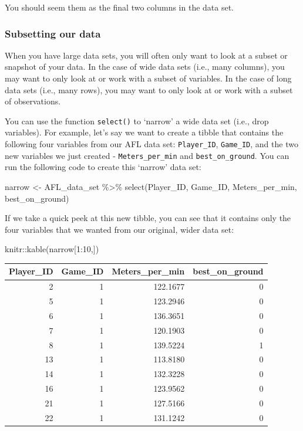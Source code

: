 \documentclass[
]{article}
\newenvironment{Shaded}{\begin{snugshade}}{\end{snugshade}}
\newcommand{\DecValTok}[1]{\textcolor[rgb]{0.00,0.00,0.81}{#1}}
\newcommand{\FunctionTok}[1]{\textcolor[rgb]{0.00,0.00,0.00}{#1}}
\newcommand{\NormalTok}[1]{#1}
\newcommand{\OtherTok}[1]{\textcolor[rgb]{0.56,0.35,0.01}{#1}}
\newcommand{\SpecialCharTok}[1]{\textcolor[rgb]{0.00,0.00,0.00}{#1}}
\begin{document}
You should seem them as the final two columns in the data set.

\hypertarget{subsetting-our-data}{%
\subsubsection{Subsetting our data}\label{subsetting-our-data}}

When you have large data sets, you will often only want to look at a
subset or snapshot of your data. In the case of wide data sets (i.e.,
many columns), you may want to only look at or work with a subset of
variables. In the case of long data sets (i.e., many rows), you may want
to only look at or work with a subset of observations.

You can use the function \texttt{select()} to `narrow' a wide data set
(i.e., drop variables). For example, let's say we want to create a
tibble that contains the following four variables from our AFL data set:
\texttt{Player\_ID}, \texttt{Game\_ID}, and the two new variables we
just created - \texttt{Meters\_per\_min} and \texttt{best\_on\_ground}.
You can run the following code to create this `narrow' data set:

\begin{Shaded}
\begin{Highlighting}[]
\NormalTok{narrow }\OtherTok{\textless{}{-}}\NormalTok{ AFL\_data\_set }\SpecialCharTok{\%\textgreater{}\%}
  \FunctionTok{select}\NormalTok{(Player\_ID, Game\_ID, Meters\_per\_min, best\_on\_ground)}
\end{Highlighting}
\end{Shaded}

If we take a quick peek at this new tibble, you can see that it contains
only the four variables that we wanted from our original, wider data
set:

\begin{Shaded}
\begin{Highlighting}[]
\NormalTok{knitr}\SpecialCharTok{::}\FunctionTok{kable}\NormalTok{(narrow[}\DecValTok{1}\SpecialCharTok{:}\DecValTok{10}\NormalTok{,])}
\end{Highlighting}
\end{Shaded}

\begin{longtable}[]{@{}rrrr@{}}
\toprule
Player\_ID & Game\_ID & Meters\_per\_min & best\_on\_ground \\
\midrule
\endhead
2 & 1 & 122.1677 & 0 \\
5 & 1 & 123.2946 & 0 \\
6 & 1 & 136.3651 & 0 \\
7 & 1 & 120.1903 & 0 \\
8 & 1 & 139.5224 & 1 \\
13 & 1 & 113.8180 & 0 \\
14 & 1 & 132.3228 & 0 \\
16 & 1 & 123.9562 & 0 \\
21 & 1 & 127.5166 & 0 \\
22 & 1 & 131.1242 & 0 \\
\bottomrule
\end{longtable}
\end{document}
